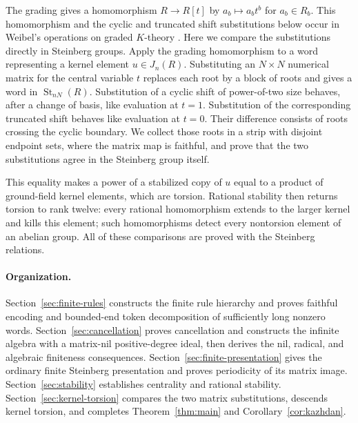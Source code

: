 \documentclass[11pt]{article}
\numberwithin{equation}{section}
\theoremstyle{definition}
\theoremstyle{remark}
\DeclareMathOperator{\St}{St}
\begin{document}
The grading gives a homomorphism $R\to R[t]$ by
$a_b\mapsto a_b t^b$ for $a_b\in R_b$. This homomorphism and the cyclic
and truncated shift substitutions below occur in Weibel's operations on
graded $K$-theory \cite[Section~1, pp.~468--469]{Weibel1987}. Here we
compare the substitutions directly in Steinberg groups. Apply the
grading homomorphism to a word representing a kernel element $u\in J_n(R)$.
Substituting an $N\times N$ numerical matrix for the central variable
$t$ replaces each root by a block of roots and gives a word in
$\St_{nN}(R)$. Substitution
of a cyclic shift of power-of-two size behaves, after a change of
basis, like evaluation at $t=1$. Substitution of the corresponding
truncated shift behaves like evaluation at $t=0$. Their difference
consists of roots crossing the cyclic boundary. We collect those roots
in a strip with disjoint endpoint sets, where the matrix map is
faithful, and prove that the two substitutions agree in the Steinberg
group itself.

This equality makes a power of a stabilized copy of $u$ equal to a
product of ground-field kernel elements, which are torsion. Rational
stability then returns torsion to rank twelve: every rational
homomorphism extends to the larger kernel and kills this element;
such homomorphisms detect every nontorsion element of an abelian group.
All of these comparisons are proved with the Steinberg relations.

\paragraph{Organization.}
Section~\ref{sec:finite-rules} constructs the finite rule hierarchy and
proves faithful encoding and bounded-end token decomposition of
sufficiently long nonzero words.
Section~\ref{sec:cancellation} proves cancellation and constructs the
infinite algebra with a matrix-nil positive-degree ideal, then derives
the nil, radical, and algebraic finiteness consequences.
Section~\ref{sec:finite-presentation}
gives the ordinary finite Steinberg presentation and proves periodicity
of its matrix image. Section~\ref{sec:stability} establishes centrality
and rational stability. Section~\ref{sec:kernel-torsion} compares the
two matrix substitutions, descends kernel torsion, and completes
Theorem~\ref{thm:main} and Corollary~\ref{cor:kazhdan}.






\begingroup
\raggedright

\endgroup
\end{document}
